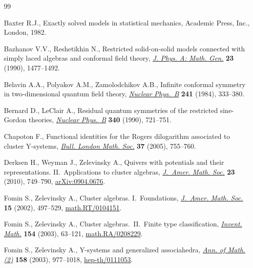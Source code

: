 \documentclass[pdftex]{sigma}
\numberwithin{equation}{section}
\theoremstyle{definition}
\begin{document}
\begin{thebibliography}{99}

\footnotesize\itemsep=0pt

Baxter R.J.,
Exactly solved models in statistical mechanics,
Academic Press, Inc., London, 1982.

Bazhanov V.V., Reshetikhin N.,
Restricted solid-on-solid models connected with simply laced algebras and conformal f\/ield theory,
\href{http://stacks.iop.org/0305-4470/23/1477}{{\em J. Phys. A: Math. Gen.}} {\bf 23} (1990), 1477--1492.

Belavin A.A., Polyakov A.M., Zamolodchikov A.B.,
Inf\/inite conformal symmetry in two-dimensional quantum f\/ield theory,
\href{http://dx.doi.org/10.1016/0550-3213(84)90052-X}{{\em Nuclear Phys.~B}} {\bf  241} (1984), 333--380.

Bernard D.,  LeClair A.,
Residual quantum symmetries of the restricted sine-Gordon theories,
\href{http://dx.doi.org/10.1016/0550-3213(90)90466-Q}{{\em Nuclear Phys.~B}} {\bf 340} (1990), 721--751.

Chapoton F.,
Functional identities for the Rogers dilogarithm associated to  cluster Y-systems,
\href{http://dx.doi.org/10.1112/S0024609305004510}{{\em Bull. London Math. Soc.}} {\bf 37} (2005), 755--760.

Derksen H., Weyman J., Zelevinsky A.,
Quivers with potentials and their representations. II.~Applications to cluster algebras,
\href{http://dx.doi.org/10.1090/S0894-0347-10-00662-4}{{\em J.~Amer. Math. Soc.}} {\bf 23} (2010), 749--790,
\href{http://arxiv.org/abs/0904.0676}{arXiv:0904.0676}.

Fomin S., Zelevinsky A.,
Cluster algebras. I.~Foundations,
\href{http://dx.doi.org/10.1090/S0894-0347-01-00385-X}{{\em J.~Amer. Math. Soc.}} {\bf 15} (2002), 497--529,
\href{http://arxiv.org/abs/math.RT/0104151}{math.RT/0104151}.

Fomin S., Zelevinsky A.,
Cluster algebras.~II.~Finite type classif\/ication,
\href{http://dx.doi.org/10.1007/s00222-003-0302-y}{{\em Invent. Math.}} {\bf  154} (2003), 63--121,
\href{http://arxiv.org/abs/math.RA/0208229}{math.RA/0208229}.

Fomin S., Zelevinsky A.,
Y-systems and generalized associahedra,
\href{http://dx.doi.org/10.4007/annals.2003.158.977}{{\em Ann. of Math. (2)}} {\bf 158} (2003), 977--1018,
\href{http://arxiv.org/abs/hep-th/0111053}{hep-th/0111053}.


\end{thebibliography}
\end{document}
